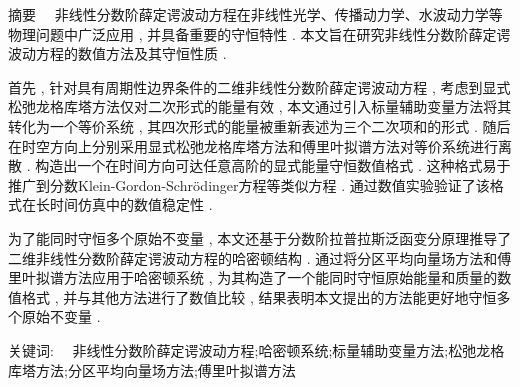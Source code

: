 
\begin{ChineseAbstract}[副教授]%
\item {\heiti 摘要\ \ }
非线性分数阶薛定谔波动方程在非线性光学、传播动力学、水波动力学等物理问题中广泛应用 , 并具备重要的守恒特性 . 本文旨在研究非线性分数阶薛定谔波动方程的数值方法及其守恒性质 . 

首先 , 针对具有周期性边界条件的二维非线性分数阶薛定谔波动方程 , 考虑到显式松弛龙格库塔方法仅对二次形式的能量有效 , 本文通过引入标量辅助变量方法将其转化为一个等价系统 , 其四次形式的能量被重新表述为三个二次项和的形式 . 
随后在时空方向上分别采用显式松弛龙格库塔方法和傅里叶拟谱方法对等价系统进行离散 . 构造出一个在时间方向可达任意高阶的显式能量守恒数值格式 . 
这种格式易于推广到分数Klein-Gordon-Schr{\"o}dinger方程等类似方程 . 
通过数值实验验证了该格式在长时间仿真中的数值稳定性 . 

为了能同时守恒多个原始不变量 , 本文还基于分数阶拉普拉斯泛函变分原理推导了二维非线性分数阶薛定谔波动方程的哈密顿结构 . 
通过将分区平均向量场方法和傅里叶拟谱方法应用于哈密顿系统 , 为其构造了一个能同时守恒原始能量和质量的数值格式 , 
并与其他方法进行了数值比较 , 结果表明本文提出的方法能更好地守恒多个原始不变量 . 

\item {\heiti 关键词:\ \ } 非线性分数阶薛定谔波动方程;\quad 哈密顿系统;\quad 标量辅助变量方法;\quad 松弛龙格库塔方法;\quad 分区平均向量场方法;\quad 傅里叶拟谱方法
\end{ChineseAbstract}

